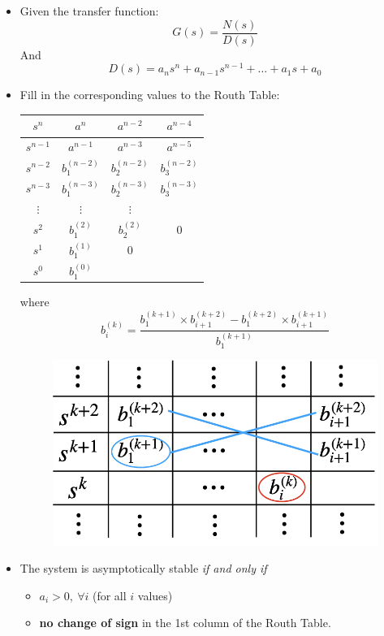 \documentclass[12pt,a4paper]{article}
\begin{document}
\begin{itemize}
\item Given the transfer function:
\[G(s) = \frac{N(s)}{D(s)}\]
And \[D(s) = a_{n}s^{n}+a_{n-1}s^{n-1}+\ldots+a_{1}s+a_{0}\]
\item Fill in the corresponding values to the Routh Table:
\begin{table}[H]\centering 
 \begin{tabular}{c|c|c|c}
 $s^{n}$ & $a^{n}$ & $a^{n-2}$ & $a^{n-4}$\\ \hline
 $s^{n-1}$ & $a^{n-1}$ & $a^{n-3}$ & $a^{n-5}$\\ \hline \hline
 $s^{n-2}$ & $b^{(n-2)}_{1}$ & $b^{(n-2)}_{2}$ & $b^{(n-2)}_{3}$ \\ \hline 
 $s^{n-3}$ & $b^{(n-3)}_{1}$ & $b^{(n-3)}_{2}$ & $b^{(n-3)}_{3}$\\ \hline
 $\vdots$&$\vdots$&$\vdots$&\\ \hline
 $s^{2}$ & $b^{(2)}_{1}$ & $b^{(2)}_{2}$ & 0 \\ \hline
 $s^{1}$ & $b^{(1)}_{1}$ & 0 & \\ \hline
 $s^{0}$ & $b^{(0)}_{1}$ & &\\ \hline
 \end{tabular}
 \end{table}
 \begin{minipage}{.4\textwidth}
 where 
 \[b_{i}^{(k)} = \frac{b_{1}^{(k+1)}\times b_{i+1}^{(k+2)} - b_{1}^{(k+2)}\times b_{i+1}^{(k+1)}}{b_{1}^{(k+1)}}\]
 \end{minipage}\hfill
  \begin{minipage}{.6\textwidth}
 \begin{figure}[H] \centering
\includegraphics[width=.7\textwidth]{images/routh.png}
\end{figure}
\end{minipage}
\item The system is asymptotically stable \textit{if and only if}
\begin{itemize}
\item $a_{i}>0 ,\ \forall i$ (for all $i$ values)
\item \textbf{no change of sign} in the 1st column of the Routh Table.
\end{itemize}
\end{itemize}
\end{document}

